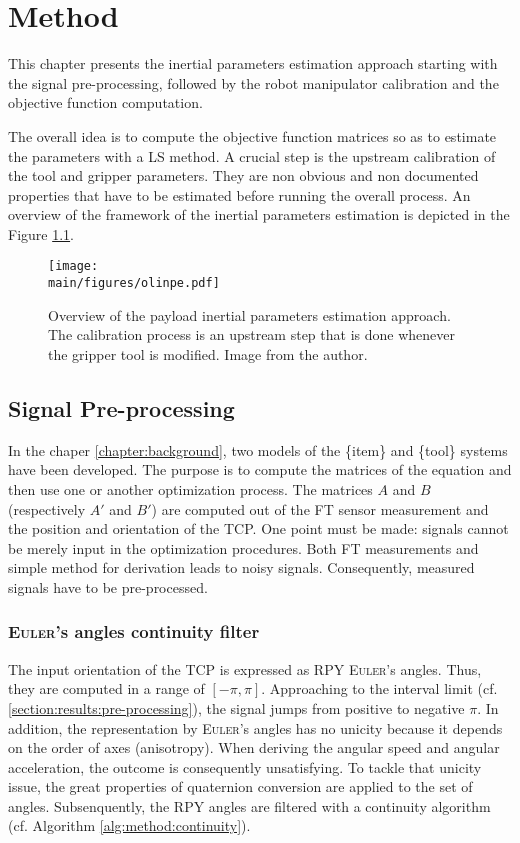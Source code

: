 \documentclass[/home/francois/latex/report/main.tex]{subfiles}
\begin{document}
\chapter{Method}
\label{chapter:method}

This chapter presents the inertial parameters estimation approach starting with the signal pre-processing, followed by the robot manipulator calibration and the objective function computation.

The overall idea is to compute the objective function matrices so as to estimate the parameters with a \ac{LS} method. A crucial step is the upstream calibration of the tool and gripper parameters. They are non obvious and non documented properties that have to be estimated before running the overall process. An overview of the framework of the inertial parameters estimation is depicted in the Figure \ref{fig:method:overall}.

\begin{figure}[h]
  \centering
  \texttt{[image: \\main/figures/olinpe.pdf]}
  \caption{Overview of the payload inertial parameters estimation approach. The calibration process is an upstream step that is done whenever the gripper tool is modified. Image from  the author.}
  \label{fig:method:overall}
\end{figure}

\section{Signal Pre-processing}
\label{section:pre-pro}

In the chaper \ref{chapter:background}, two models of the \{item\} and \{tool\} systems have been developed. The purpose is to compute the matrices of the equation and then use one or another optimization process. The matrices $A$ and $B$ (respectively $A'$ and $B'$) are computed out of the \ac{FT} sensor measurement and the position and orientation of the \ac{TCP}. One point must be made: signals cannot be merely input in the optimization procedures. Both \ac{FT} measurements and simple method for derivation leads to noisy signals. Consequently, measured signals have to be pre-processed.

\subsection{\textsc{Euler}'s angles continuity filter}
\label{subsection:method:euler-filter}

The input orientation of the \ac{TCP} is expressed as \ac{RPY} \textsc{Euler}'s angles. Thus, they are computed in a range of $[-\pi, \pi]$. Approaching to the interval limit (cf. \ref{section:results:pre-processing}), the signal jumps from positive to negative $\pi$. In addition, the representation by \textsc{Euler}'s angles has no unicity because it depends on the order of axes (anisotropy). When deriving the angular speed and angular acceleration, the outcome is consequently unsatisfying. To tackle that unicity issue, the great properties of quaternion conversion are applied to the set of angles. Subsenquently, the \ac{RPY} angles are filtered with a continuity algorithm (cf. Algorithm \ref{alg:method:continuity}).
\end{document}
